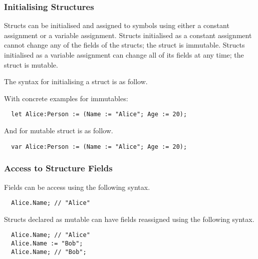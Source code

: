 \subsubsection{Initialising Structures}
\label{sec:initStructures}

Structs can be initialised and assigned to symbols using either a constant assignment or a variable assignment. Structs initialised as a constant assignment cannot change any of the fields of the structs; the struct is immutable. Structs initialised as a variable assignment can change all of its fields at any time; the struct is mutable.

The syntax for initialising a struct is as follow.


With concrete examples for immutables:

\begin{verbatim}
  let Alice:Person := (Name := "Alice"; Age := 20);
\end{verbatim}

And for mutable struct is as follow.

\begin{verbatim}
  var Alice:Person := (Name := "Alice"; Age := 20);
\end{verbatim}

\subsubsection{Access to Structure Fields}
\label{sec:accessStructFields}

Fields can be access using the following syntax.

\begin{verbatim}
  Alice.Name; // "Alice"
\end{verbatim}

Structs declared as mutable can have fields reassigned using the following syntax.

\begin{verbatim}
  Alice.Name; // "Alice"
  Alice.Name := "Bob";
  Alice.Name; // "Bob";
\end{verbatim}
